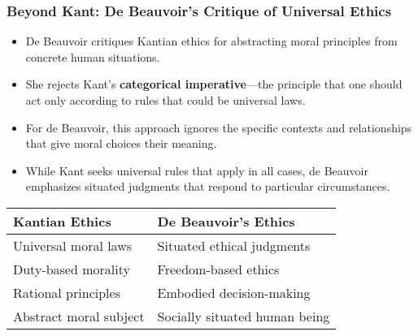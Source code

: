 \documentclass[aspectratio=169]{beamer}
\begin{document}
		\begin{frame}
			\frametitle{Beyond Kant: De Beauvoir's Critique of Universal Ethics}
			\begin{itemize}
				\item De Beauvoir critiques Kantian ethics for abstracting moral principles from concrete human situations.
				\item She rejects Kant's \textbf{categorical imperative}—the principle that one should act only according to rules that could be universal laws.
				\item For de Beauvoir, this approach ignores the specific contexts and relationships that give moral choices their meaning.
				\item While Kant seeks universal rules that apply in all cases, de Beauvoir emphasizes situated judgments that respond to particular circumstances.
			\end{itemize}
			
			\begin{tabular}{|p{5.5cm}|p{5.5cm}|}
				\hline
				\textbf{Kantian Ethics} & \textbf{De Beauvoir's Ethics} \\
				\hline
				Universal moral laws & Situated ethical judgments \\
				Duty-based morality & Freedom-based ethics \\
				Rational principles & Embodied decision-making \\
				Abstract moral subject & Socially situated human being \\
				\hline
			\end{tabular}
		\end{frame}
		
\end{document}

